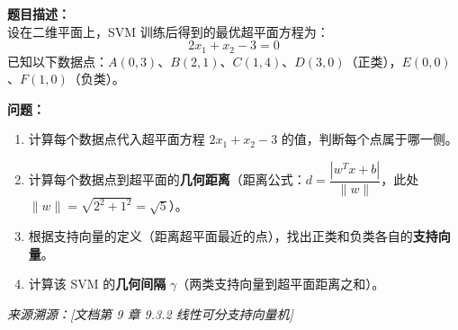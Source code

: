 \documentclass[a4paper,11pt]{ctexart}
\begin{document}
\begin{problembox}
    \textbf{题目描述：}\\
    设在二维平面上，SVM 训练后得到的最优超平面方程为：
    \[
    2x_1 + x_2 - 3 = 0
    \]
    已知以下数据点：$A(0, 3)$、$B(2, 1)$、$C(1, 4)$、$D(3, 0)$（正类），$E(0, 0)$、$F(1, 0)$（负类）。

    \vspace{0.2cm}
    \textbf{问题：}
    \begin{enumerate}[(1)]
        \item 计算每个数据点代入超平面方程 $2x_1 + x_2 - 3$ 的值，判断每个点属于哪一侧。

        \item 计算每个数据点到超平面的\textbf{几何距离}（距离公式：$d = \dfrac{|w^T x + b|}{\|w\|}$，此处 $\|w\| = \sqrt{2^2+1^2} = \sqrt{5}$）。

        \item 根据支持向量的定义（距离超平面最近的点），找出正类和负类各自的\textbf{支持向量}。

        \item 计算该 SVM 的\textbf{几何间隔} $\gamma$（两类支持向量到超平面距离之和）。
    \end{enumerate}

    \vspace{0.2cm}
    {\color{gray}\small\textit{来源溯源：[文档第 9 章 9.3.2 线性可分支持向量机]}}
\end{problembox}
\end{document}
